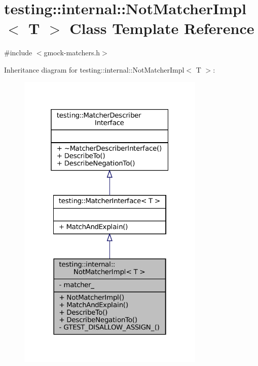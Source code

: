 \hypertarget{classtesting_1_1internal_1_1NotMatcherImpl}{}\section{testing\+:\+:internal\+:\+:Not\+Matcher\+Impl$<$ T $>$ Class Template Reference}
\label{classtesting_1_1internal_1_1NotMatcherImpl}


{\ttfamily \#include $<$gmock-\/matchers.\+h$>$}



Inheritance diagram for testing\+:\+:internal\+:\+:Not\+Matcher\+Impl$<$ T $>$\+:
\nopagebreak
\begin{figure}[H]
\begin{center}
\leavevmode
\includegraphics[width=253pt]{classtesting_1_1internal_1_1NotMatcherImpl__inherit__graph}
\end{center}
\end{figure}


